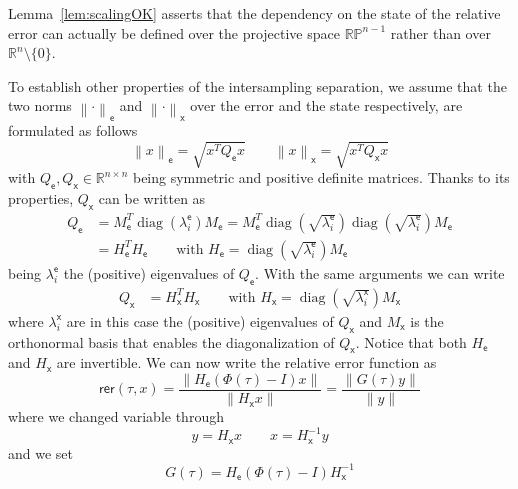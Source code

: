 \documentclass[12pt,draftcls,onecolumn]{IEEEtran} %
\newcommand{\nE}[1]{\left\|#1\right\|_{\mathsf e}}
\newcommand{\nX}[1]{\left\|#1\right\|_{\mathsf x}}
\newcommand{\RR}{\mathbb{R}}
\DeclareMathOperator{\diag}{diag}
\begin{document}
Lemma~\ref{lem:scalingOK} asserts that the dependency on the state of
the relative error can actually be defined over the projective space
$\RR\mathbb{P}^{n-1}$ rather than over $\RR^n\setminus\{0\}$.

To establish other properties of the intersampling separation, we
assume that the two norms $\nE{\cdot}$ and $\nX{\cdot}$ over the error
and the state respectively, are formulated as follows
\begin{equation}
  \label{eq:quadraticNomrs}
  \nE{x} = \sqrt{x^TQ_\mathsf{e}x}
  \qquad
  \nX{x} = \sqrt{x^TQ_\mathsf{x}x}
\end{equation}
with $Q_\mathsf{e},Q_\mathsf{x}\in\RR^{n\times n}$ being symmetric and
positive definite matrices. Thanks to its properties, $Q_\mathsf{x}$
can be written as
\begin{align*}
  Q_\mathsf{e}&=M_\mathsf{e}^T\diag(\lambda_i^\mathsf{e})M_\mathsf{e}
  = M_\mathsf{e}^T\diag(\sqrt{\lambda_i^\mathsf{e}})\diag(\sqrt{\lambda_i^\mathsf{e}})M_\mathsf{e}\\
  & =H_\mathsf{e}^TH_\mathsf{e}\qquad \text{with
    $H_\mathsf{e}=\diag(\sqrt{\lambda_i^\mathsf{e}})M_\mathsf{e}$}
\end{align*}
being $\lambda_i^\mathsf{e}$ the (positive) eigenvalues of
$Q_\mathsf{e}$.  With the same arguments we can write
\begin{align*}
  Q_\mathsf{x}& =H_\mathsf{x}^TH_\mathsf{x}\qquad \text{with
    $H_\mathsf{x}=\diag(\sqrt{\lambda_i^\mathsf{x}})M_\mathsf{x}$}
\end{align*}
where $\lambda_i^\mathsf{x}$ are in this case the (positive)
eigenvalues of $Q_\mathsf{x}$ and $M_\mathsf{x}$ is the orthonormal
basis that enables the diagonalization of $Q_\mathsf{x}$. Notice that
both $H_\mathsf{e}$ and $H_\mathsf{x}$ are invertible. We can now
write the relative error function as
\begin{equation}
  \mathsf{rer}(\tau,x)=
  \frac{\|H_\mathsf{e}(\Phi(\tau)-I)x\|}
  {\|H_\mathsf{x}x\|} = \frac{\|G(\tau)y\|}
  {\|y\|}
  \label{eq:rerGtau}
\end{equation}
where we changed variable through
\begin{equation}
  \label{eq:varChange}
  y=H_\mathsf{x}x \qquad x=H_\mathsf{x}^{-1}y
\end{equation}
and we set
\begin{equation}
  \label{eq:setGtau}
  G(\tau)=H_\mathsf{e}(\Phi(\tau)-I)H_\mathsf{x}^{-1}
\end{equation}
\end{document}
